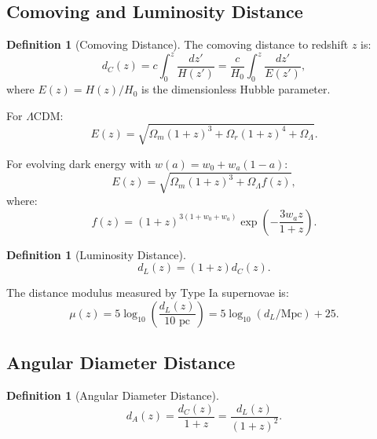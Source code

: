 \documentclass[11pt,a4paper]{article}
\newcommand{\OmegaLam}{\ensuremath{\Omega_\Lambda}}
\newcommand{\OmegaM}{\ensuremath{\Omega_m}}
\theoremstyle{definition}
\newtheorem{definition}[theorem]{Definition}
\theoremstyle{remark}
\begin{document}
\subsection{Comoving and Luminosity Distance}
\label{sec:distances}

\begin{definition}[Comoving Distance]
The comoving distance to redshift $z$ is:
\begin{equation}
d_C(z) = c\int_0^z \frac{dz'}{H(z')} = \frac{c}{H_0}\int_0^z \frac{dz'}{E(z')},
\end{equation}
where $E(z) = H(z)/H_0$ is the dimensionless Hubble parameter.
\end{definition}

For $\Lambda$CDM:
\begin{equation}
E(z) = \sqrt{\OmegaM(1+z)^3 + \Omega_r(1+z)^4 + \OmegaLam}.
\end{equation}

For evolving dark energy with $w(a) = w_0 + w_a(1-a)$:
\begin{equation}
E(z) = \sqrt{\OmegaM(1+z)^3 + \OmegaLam f(z)},
\end{equation}
where:
\begin{equation}
f(z) = (1+z)^{3(1+w_0+w_a)}\exp\left(-\frac{3w_a z}{1+z}\right).
\end{equation}

\begin{definition}[Luminosity Distance]
\begin{equation}
\boxed{d_L(z) = (1+z)d_C(z).}
\end{equation}
\end{definition}

The distance modulus measured by Type Ia supernovae is:
\begin{equation}
\mu(z) = 5\log_{10}\left(\frac{d_L(z)}{10 \text{ pc}}\right) = 5\log_{10}(d_L/\text{Mpc}) + 25.
\end{equation}

\subsection{Angular Diameter Distance}
\label{sec:angular_distance}

\begin{definition}[Angular Diameter Distance]
\begin{equation}
\boxed{d_A(z) = \frac{d_C(z)}{1+z} = \frac{d_L(z)}{(1+z)^2}.}
\end{equation}
\end{definition}
\end{document}
